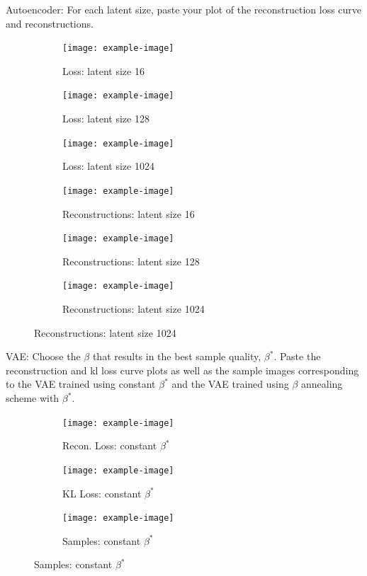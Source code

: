 \documentclass[11pt,addpoints,answers]{exam}
\numberwithin{equation}{section} %
\numberwithin{figure}{section} %
\numberwithin{table}{section} %
\begin{document}
\begin{questions}
\question Autoencoder: For each latent size, paste your plot of the reconstruction loss curve and reconstructions.
\\
\begin{figure}[H]
    \centering
    \begin{subfigure}[b]{0.32\linewidth}
    \texttt{[image: example-image]}
    \caption{Loss: latent size 16}
    \end{subfigure}
    \begin{subfigure}[b]{0.32\linewidth}
        \texttt{[image: example-image]}
        \caption{Loss: latent size 128}
    \end{subfigure}
    \begin{subfigure}[b]{0.32\linewidth}
        \texttt{[image: example-image]}
        \caption{Loss: latent size 1024}
    \end{subfigure}
    \begin{subfigure}[b]{0.32\linewidth}
    \texttt{[image: example-image]}
    \caption{Reconstructions: latent size 16}
    \end{subfigure}
    \begin{subfigure}[b]{0.32\linewidth}
        \texttt{[image: example-image]}
        \caption{Reconstructions: latent size 128}
    \end{subfigure}
    \begin{subfigure}[b]{0.32\linewidth}
        \texttt{[image: example-image]}
        \caption{Reconstructions: latent size 1024}
    \end{subfigure}
\end{figure}
\question VAE: Choose the $\beta$ that results in the best sample quality, $\beta^*$. Paste the reconstruction and kl loss curve plots as well as the sample images corresponding to the VAE trained using constant $\beta^*$ and the VAE trained using $\beta$ annealing scheme with $\beta^*$.
\\
\begin{figure}[H]
    \centering
    \begin{subfigure}[b]{0.32\linewidth}
    \texttt{[image: example-image]}
    \caption{Recon. Loss: constant $\beta^*$}
    \end{subfigure}
    \begin{subfigure}[b]{0.32\linewidth}
    \texttt{[image: example-image]}
    \caption{KL Loss: constant $\beta^*$}
    \end{subfigure}
    \begin{subfigure}[b]{0.32\linewidth}
    \texttt{[image: example-image]}
    \caption{Samples: constant $\beta^*$}
    \end{subfigure}
    

\end{figure}
\end{questions}
\end{document}
